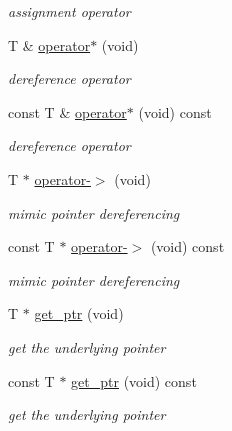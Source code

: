 \begin{DoxyCompactItemize}
\begin{DoxyCompactList}\small\item\em assignment operator \item\end{DoxyCompactList}\item 
T \& \hyperlink{classMadara_1_1Utility_1_1Refcounter_a5c703bcc57e1351192f2757e6cc3e1e8}{operator$\ast$} (void)
\begin{DoxyCompactList}\small\item\em dereference operator \item\end{DoxyCompactList}\item 
const T \& \hyperlink{classMadara_1_1Utility_1_1Refcounter_a11b2cf9754c08669ce2ba7b59cd5e2c8}{operator$\ast$} (void) const 
\begin{DoxyCompactList}\small\item\em dereference operator \item\end{DoxyCompactList}\item 
T $\ast$ \hyperlink{classMadara_1_1Utility_1_1Refcounter_a7df3f7fa6e6fc6a8f597b513f1bfbf94}{operator-\/$>$} (void)
\begin{DoxyCompactList}\small\item\em mimic pointer dereferencing \item\end{DoxyCompactList}\item 
const T $\ast$ \hyperlink{classMadara_1_1Utility_1_1Refcounter_a44d3d8e510f86842eba4b28472a3c6c9}{operator-\/$>$} (void) const 
\begin{DoxyCompactList}\small\item\em mimic pointer dereferencing \item\end{DoxyCompactList}\item 
T $\ast$ \hyperlink{classMadara_1_1Utility_1_1Refcounter_a1b54a489b45b453c1c6d2ba0b9e75440}{get\_\-ptr} (void)
\begin{DoxyCompactList}\small\item\em get the underlying pointer \item\end{DoxyCompactList}\item 
const T $\ast$ \hyperlink{classMadara_1_1Utility_1_1Refcounter_a5c6dfe5c9ae73e97b5c381839fa46a9c}{get\_\-ptr} (void) const 
\begin{DoxyCompactList}\small\item\em get the underlying pointer \item\end{DoxyCompactList}\end{DoxyCompactItemize}
